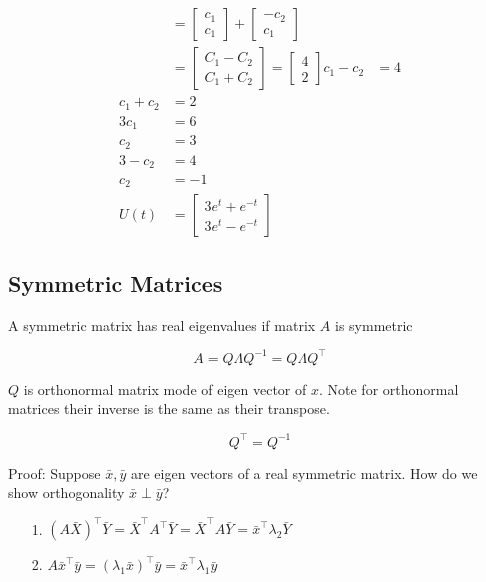\documentclass[main.tex]{subfiles}
\begin{document}
$$\begin{aligned}
    &=\left[\begin{array}{l}
    c_{1} \\
    c_{1}
    \end{array}\right]+\left[\begin{array}{c}
    -c_{2} \\
    c_{1}
    \end{array}\right]\\
    &=\left[\begin{array}{l}
    C_{1}-C_{2} \\
    C_{1}+C_{2}
    \end{array}\right]=\left[\begin{array}{l}
    4 \\
    2
    \end{array}\right]
    c_{1}-c_{2} &= 4 \\
    c_{1}+c_{2} & =2 \\
    3c_{1} &= 6 \\
    c_{2} &= 3 \\
    3-c_{2}&=4 \\
    c_{2}&=-1 \\
    U(t) &= \left[\begin{array}{l}
    3 e^{t} + e^{-t} \\
    3 e^{t} - e^{-t}
    \end{array}\right]
    \end{aligned}
    $$
 
\subsection{Symmetric Matrices}

    A symmetric matrix has real eigenvalues if matrix $A$ is symmetric
    
    $$
    A=Q \Lambda Q^{-1}=Q \Lambda Q^{\top}
    $$

    $Q$ is orthonormal matrix mode of eigen vector of $x$. Note for orthonormal matrices their inverse is the same as their transpose.
    
    $$
    Q^{\top}=Q^{-1}
    $$

    Proof: Suppose $\bar{x}, \bar{y}$ are eigen vectors of a real symmetric matrix. How do we show orthogonality $\bar{x} \perp \bar{y}$?
    \begin{enumerate}
        \item [1.] $(A \bar{X})^{\top} \bar{Y} = \bar{X}^{\top} A^{\top} \bar{Y} = \bar{X}^{\top} A \bar{Y} = \bar{x}^{\top} \lambda_{2} \bar{Y}$
        \item [2.] $A \bar{x}^{\top} \bar{y} = \left(\lambda_{1} \bar{x} \right)^{\top} \bar{y} = \bar{x}^{\top} \lambda_{1} \bar{y}$ 
    \end{enumerate}
        
\end{document}

